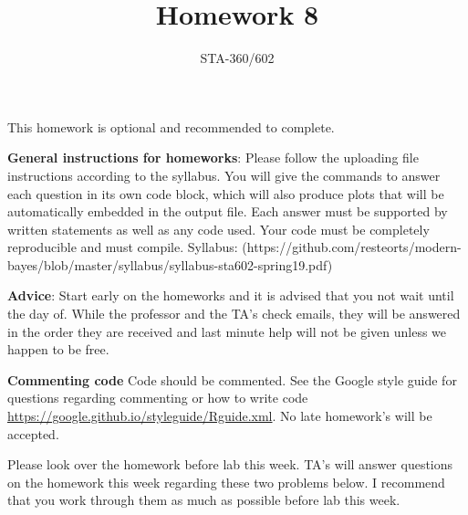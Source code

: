 \documentclass{article}
\begin{document}
\title{Homework 8}
\author{STA-360/602}
\date{}
\maketitle

This homework is optional and recommended to complete. 

\textbf{General instructions for homeworks}: Please follow the uploading file instructions according to the syllabus. You will give the commands to answer each question in its own code block, which will also produce plots that will be automatically embedded in the output file. Each answer must be supported by written statements as well as any code used. Your code must be completely reproducible and must compile. Syllabus: (https://github.com/resteorts/modern-bayes/blob/master/syllabus/syllabus-sta602-spring19.pdf)

\textbf{Advice}: Start early on the homeworks and it is advised that you not wait until the day of. While the professor and the TA's check emails, they will be answered in the order they are received and last minute help will not be given unless we happen to be free.  

\textbf{Commenting code}
Code should be commented. See the Google style guide for questions regarding commenting or how to write 
code \url{https://google.github.io/styleguide/Rguide.xml}. No late homework's will be accepted.

Please look over the homework before lab this week. TA's will answer questions on the homework this week regarding these two 
problems below. I recommend that you work through them as much as possible before lab this week. 
\end{document}
